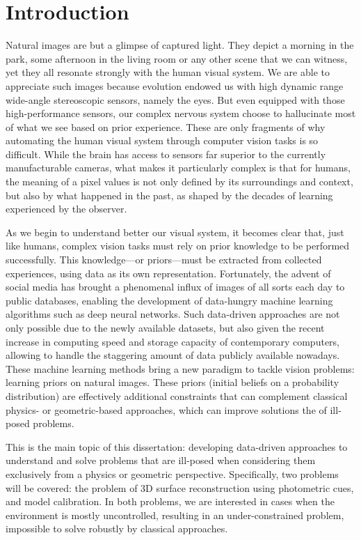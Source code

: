 \chapter*{Introduction}         %

Natural images are but a glimpse of captured light. They depict a morning in the park, some afternoon in the living room or any other scene that we can witness, yet they all resonate strongly with the human visual system. We are able to appreciate such images because evolution endowed us with high dynamic range wide-angle stereoscopic sensors, namely the eyes. But even equipped with those high-performance sensors, our complex nervous system choose to hallucinate most of what we see based on prior experience. These are only fragments of why automating the human visual system through computer vision tasks is so difficult. While the brain has access to sensors far superior to the currently manufacturable cameras, what makes it particularly complex is that for humans, the meaning of a pixel values is not only defined by its surroundings and context, but also by what happened in the past, as shaped by the decades of learning experienced by the observer.

As we begin to understand better our visual system, it becomes clear that, just like humans, complex vision tasks must rely on prior knowledge to be performed successfully. This knowledge---or priors---must be extracted from collected experiences, using data as its own representation. Fortunately, the advent of social media has brought a phenomenal influx of images of all sorts each day to public databases, enabling the development of data-hungry machine learning algorithms such as deep neural networks. Such data-driven approaches are not only possible due to the newly available datasets, but also given the recent increase in computing speed and storage capacity of contemporary computers, allowing to handle the staggering amount of data publicly available nowadays. These machine learning methods bring a new paradigm to tackle vision problems: learning priors on natural images. These priors (initial beliefs on a probability distribution) are effectively additional constraints that can complement classical physics- or geometric-based approaches, which can improve solutions the of ill-posed problems.

This is the main topic of this dissertation: developing data-driven approaches to understand and solve problems that are ill-posed when considering them exclusively from a physics or geometric perspective. Specifically, two problems will be covered: the problem of 3D surface reconstruction using photometric cues, and model calibration. In both problems, we are interested in cases when the environment is mostly uncontrolled, resulting in an under-constrained problem, impossible to solve robustly by classical approaches.

